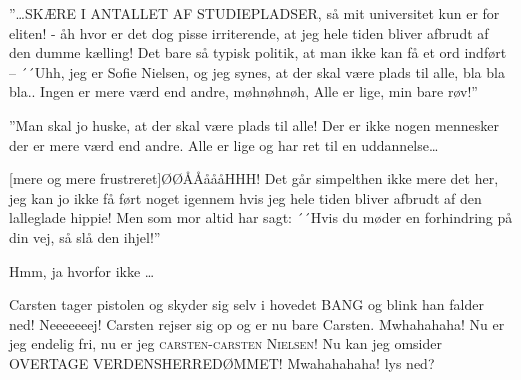 \documentclass[a4paper,11pt]{article}
\begin{document}
\begin{sketch}
 ”\ldots SKÆRE I ANTALLET AF STUDIEPLADSER, så mit universitet kun er for eliten! - åh hvor er det dog pisse irriterende, at jeg hele tiden bliver afbrudt af den dumme kælling! Det bare så typisk politik, at man ikke kan få et ord indført –  ´´Uhh, jeg er Sofie Nielsen, og jeg synes, at der skal være plads til alle, bla bla bla.. Ingen er mere værd end andre, møhnøhnøh, Alle er lige, min bare røv!'' 

 ”Man skal jo huske, at der skal være plads til alle! Der er ikke nogen mennesker der er mere værd end andre. Alle er lige og har ret til en uddannelse\ldots

[mere og mere frustreret]ØØÅÅåååHHH! Det går simpelthen ikke mere det her, jeg kan jo ikke få ført noget igennem hvis jeg hele tiden bliver afbrudt af den lalleglade hippie! Men som mor altid har sagt: ´´Hvis du møder en forhindring på din vej, så slå den ihjel!''


 Hmm, ja hvorfor ikke \ldots

\scene Carsten tager pistolen og skyder sig selv i hovedet
\scene BANG og blink han falder ned! 
 Neeeeeeej!
\scene Carsten rejser sig op og er nu bare Carsten.
 Mwhahahaha! Nu er jeg endelig fri, nu er jeg \textsc{carsten-carsten Nielsen}! Nu kan jeg omsider OVERTAGE VERDENSHERREDØMMET! Mwahahahaha!
lys ned?


\end{sketch}
\end{document}
